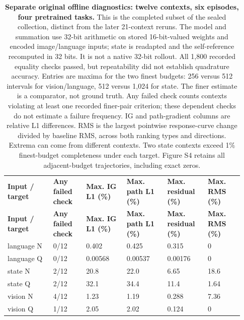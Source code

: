 \setlength{\tabcolsep}{2pt}
\begin{longtable}{p{0.180\linewidth} p{0.130\linewidth} p{0.160\linewidth} p{0.160\linewidth} p{0.160\linewidth} p{0.140\linewidth}}
\noalign{\addtocounter{table}{-1}}
\caption*{\textbf{Separate original offline diagnostics: twelve contexts, six episodes, four pretrained tasks.} This is the completed subset of the sealed collection, distinct from the later 21-context reruns. The model and summation use 32-bit arithmetic on stored 16-bit-valued weights and encoded image/language inputs; state is readapted and the self-reference recomputed in 32 bits. It is not a native 32-bit rollout. All 1,800 recorded equality checks passed, but repeatability did not establish quadrature accuracy. Entries are maxima for the two finest budgets: 256 versus 512 intervals for vision/language, 512 versus 1,024 for state. The finer estimate is a comparator, not ground truth. Any failed check counts contexts violating at least one recorded finer-pair criterion; these dependent checks do not estimate a failure frequency. IG and path-gradient columns are relative L1 differences. RMS is the largest pointwise response-curve change divided by baseline RMS, across both ranking types and directions. Extrema can come from different contexts. Two state contexts exceed 1\% finest-budget completeness under each target. Figure S4 retains all adjacent-budget trajectories, including exact zeros.}\\
\toprule
\textbf{Input / target} & \textbf{Any failed check} & \textbf{Max. IG L1 (\%)} & \textbf{Max. path L1 (\%)} & \textbf{Max. residual (\%)} & \textbf{Max. RMS (\%)} \\
\midrule\endfirsthead
\toprule
\textbf{Input / target} & \textbf{Any failed check} & \textbf{Max. IG L1 (\%)} & \textbf{Max. path L1 (\%)} & \textbf{Max. residual (\%)} & \textbf{Max. RMS (\%)} \\
\midrule\endhead
\bottomrule\endfoot
language N & 0/12 & 0.402 & 0.425 & 0.315 & 0 \\
language Q & 0/12 & 0.00568 & 0.00537 & 0.00176 & 0 \\
state N & 2/12 & 20.8 & 22.0 & 6.65 & 18.6 \\
state Q & 2/12 & 32.1 & 34.4 & 11.4 & 1.64 \\
vision N & 4/12 & 1.23 & 1.19 & 0.288 & 7.36 \\
vision Q & 1/12 & 2.05 & 2.02 & 0.124 & 0 \\
\end{longtable}
